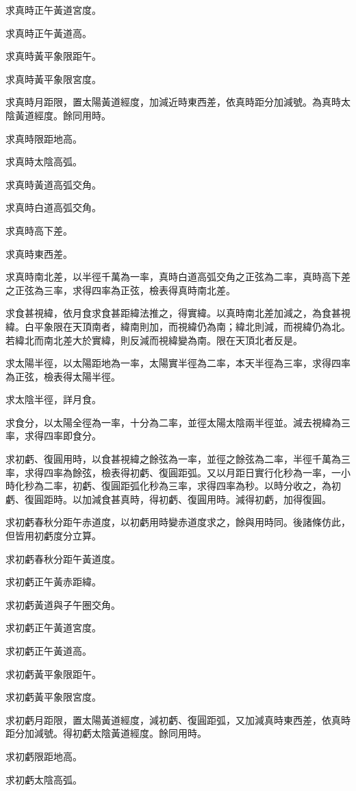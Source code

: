\begin{pinyinscope}
求真時正午黃道宮度。

求真時正午黃道高。

求真時黃平象限距午。

求真時黃平象限宮度。

求真時月距限，置太陽黃道經度，加減近時東西差，依真時距分加減號。為真時太陰黃道經度。餘同用時。

求真時限距地高。

求真時太陰高弧。

求真時黃道高弧交角。

求真時白道高弧交角。

求真時高下差。

求真時東西差。

求真時南北差，以半徑千萬為一率，真時白道高弧交角之正弦為二率，真時高下差之正弦為三率，求得四率為正弦，檢表得真時南北差。

求食甚視緯，依月食求食甚距緯法推之，得實緯。以真時南北差加減之，為食甚視緯。白平象限在天頂南者，緯南則加，而視緯仍為南；緯北則減，而視緯仍為北。若緯北而南北差大於實緯，則反減而視緯變為南。限在天頂北者反是。

求太陽半徑，以太陽距地為一率，太陽實半徑為二率，本天半徑為三率，求得四率為正弦，檢表得太陽半徑。

求太陰半徑，詳月食。

求食分，以太陽全徑為一率，十分為二率，並徑太陽太陰兩半徑並。減去視緯為三率，求得四率即食分。

求初虧、復圓用時，以食甚視緯之餘弦為一率，並徑之餘弦為二率，半徑千萬為三率，求得四率為餘弦，檢表得初虧、復圓距弧。又以月距日實行化秒為一率，一小時化秒為二率，初虧、復圓距弧化秒為三率，求得四率為秒。以時分收之，為初虧、復圓距時。以加減食甚真時，得初虧、復圓用時。減得初虧，加得復圓。

求初虧春秋分距午赤道度，以初虧用時變赤道度求之，餘與用時同。後諸條仿此，但皆用初虧度分立算。

求初虧春秋分距午黃道度。

求初虧正午黃赤距緯。

求初虧黃道與子午圈交角。

求初虧正午黃道宮度。

求初虧正午黃道高。

求初虧黃平象限距午。

求初虧黃平象限宮度。

求初虧月距限，置太陽黃道經度，減初虧、復圓距弧，又加減真時東西差，依真時距分加減號。得初虧太陰黃道經度。餘同用時。

求初虧限距地高。

求初虧太陰高弧。


\end{pinyinscope}
